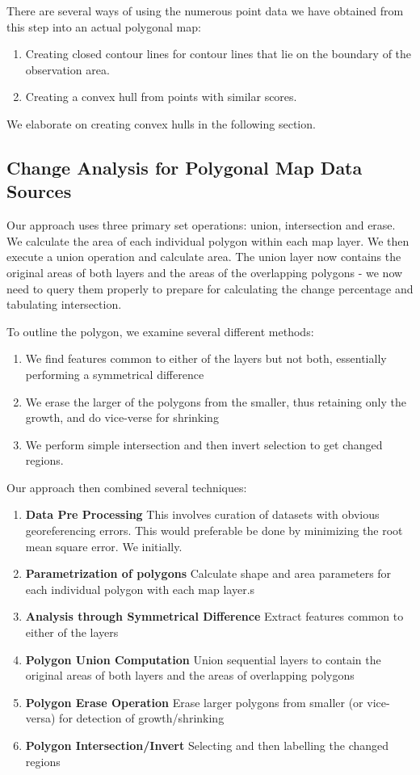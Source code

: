 \documentclass[conference]{IEEEtran}
\begin{document}
There are several ways of using the numerous point data we have obtained from this step into an actual polygonal map: 

\begin{enumerate}

\item Creating closed contour lines for contour lines that lie on the boundary of the observation area.
\item Creating a convex hull from points with similar scores.
\end{enumerate}

We elaborate on creating convex hulls in the following section.

\subsection{Change Analysis for Polygonal Map Data Sources}


Our approach uses three primary set operations: union, intersection and erase. We calculate the area of each individual polygon within each map layer. We then execute a union operation and calculate area. The union layer now contains the original areas of both layers and the areas of the overlapping polygons - we now need to query them properly to prepare for calculating the change percentage and tabulating intersection.

To outline the polygon, we examine several different methods:
\begin{enumerate}
	\item We find features common to either of the layers but not both, essentially performing a symmetrical difference
	\item We erase the larger of the polygons from the smaller, thus retaining only the growth, and do vice-verse for shrinking
	\item We perform simple intersection and then invert selection to get changed regions. 
\end{enumerate}

Our approach then combined several techniques:
\begin{enumerate}
	\item \textbf{Data Pre Processing} This involves curation of datasets with obvious georeferencing errors. This would preferable be done by minimizing the root mean square error. We initially.
	\item \textbf{Parametrization of polygons} Calculate shape and area parameters for each individual polygon with each map layer.s
	\item \textbf{Analysis through Symmetrical Difference} Extract features common to either of the layers
	\item \textbf{Polygon Union Computation} Union sequential layers to contain the original areas of both layers and the areas of overlapping polygons
	\item \textbf{Polygon Erase Operation} Erase larger polygons from smaller (or vice-versa) for detection of growth/shrinking
	\item \textbf{Polygon Intersection/Invert} Selecting and then labelling the changed regions
\end{enumerate}
\end{document}
